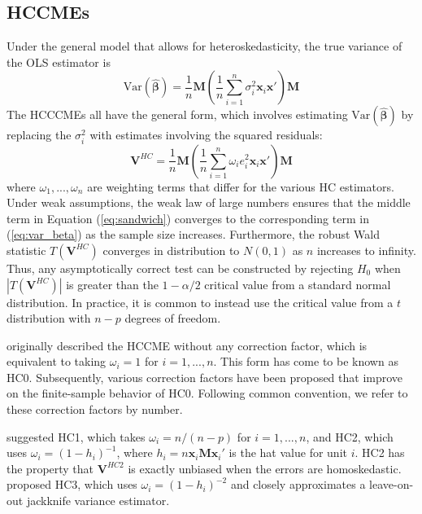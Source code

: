 \documentclass[12pt]{article}\usepackage[]{graphicx}\usepackage[]{color}
\newcommand{\Var}{\text{Var}}
\newcommand{\bm}{\mathbf}
\newcommand{\bs}{\boldsymbol}
\begin{document}
\subsection{HCCMEs}

Under the general model that allows for heteroskedasticity, the true variance of the OLS estimator is 
\begin{equation}
\label{eq:var_beta}
\Var\left(\bs{\hat\beta}\right) = \frac{1}{n} \bm{M} \left(\frac{1}{n}\sum_{i=1}^n \sigma_i^2 \bm{x}_i\bm{x}'\right) \bm{M}
\end{equation}
The HCCCMEs all have the general form, which involves estimating $\Var\left(\bs{\hat\beta}\right)$ by replacing the $\sigma_i^2$ with estimates involving the squared residuals:
\begin{equation}
\label{eq:sandwich}
\bm{V}^{HC} = \frac{1}{n} \bm{M} \left(\frac{1}{n}\sum_{i=1}^n \omega_i e_i^2 \bm{x}_i\bm{x}'\right)\bm{M} 
\end{equation}
where $\omega_{1},...,\omega_{n}$ are weighting terms that differ for the various HC estimators. 
Under weak assumptions, the weak law of large numbers ensures that the middle term in Equation (\ref{eq:sandwich}) converges to the corresponding term in (\ref{eq:var_beta}) as the sample size increases. 
Furthermore, the robust Wald statistic $T\left(\bm{V}^{HC}\right)$ converges in distribution to $N(0,1)$ as $n$ increases to infinity. 
Thus, any asymptotically correct test can be constructed by rejecting $H_0$ when $\left|T\left(\bm{V}^{HC}\right)\right|$ is greater than the $1 - \alpha / 2$ critical value from a standard normal distribution. 
In practice, it is common to instead use the critical value from a $t$ distribution with $n - p$ degrees of freedom.

\citet{White1980heteroskedasticity} originally described the HCCME without any correction factor, which is equivalent to taking $\omega_i = 1$ for $i = 1,...,n$. 
This form has come to be known as HC0. 
Subsequently, various correction factors have been proposed that improve on the finite-sample behavior of HC0. 
Following common convention, we refer to these correction factors by number. 

\citet{MacKinnon1985some} suggested HC1, which takes $\omega_i = n / (n - p)$ for $i = 1,...,n$, and HC2, which uses $\omega_i = \left(1 - h_i\right)^{-1}$, where $h_i = n \bm{x}_i \bm{M} \bm{x}_i'$ is the hat value for unit $i$. 
HC2 has the property that $\bm{V}^{HC2}$ is exactly unbiased when the errors are homoskedastic. 
\citet{Davidson1993estimation} proposed HC3, which uses $\omega_i =  \left(1 - h_i\right)^{-2}$ and closely approximates a leave-on-out jackknife variance estimator. 
\end{document}
